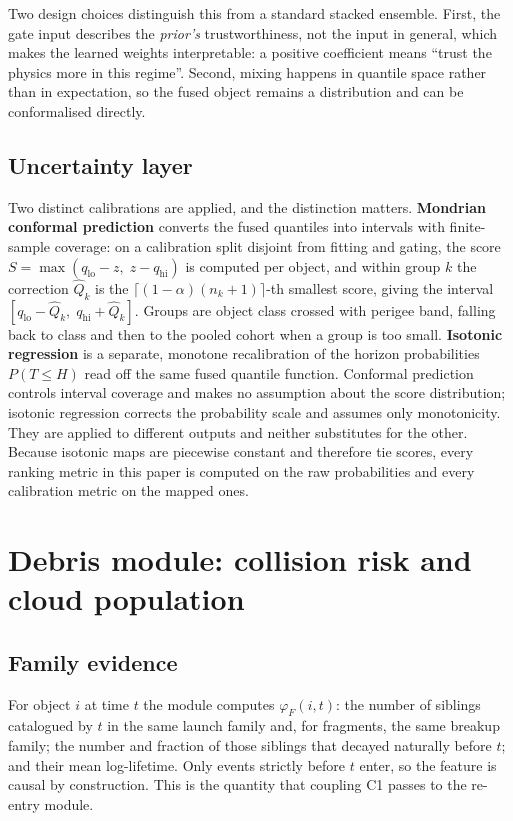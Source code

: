 \documentclass[3p,times]{elsarticle}
\begin{document}
Two design choices distinguish this from a standard stacked ensemble.
First, the gate input describes the \emph{prior's} trustworthiness, not
the input in general, which makes the learned weights interpretable: a
positive coefficient means ``trust the physics more in this regime''.
Second, mixing happens in quantile space rather than in expectation, so
the fused object remains a distribution and can be conformalised
directly.

\subsection{Uncertainty layer}\label{uncertainty-layer}

Two distinct calibrations are applied, and the distinction matters.
\textbf{Mondrian conformal prediction} converts the fused quantiles into
intervals with finite-sample coverage: on a calibration split disjoint
from fitting and gating, the score
\(S = \max(q_{\text{lo}} - z,\; z - q_{\text{hi}})\) is computed per
object, and within group \(k\) the correction \(\hat{Q}_k\) is the
\(\lceil (1-\alpha)(n_k+1) \rceil\)-th smallest score, giving the
interval \([q_{\text{lo}} - \hat{Q}_k,\; q_{\text{hi}} + \hat{Q}_k]\).
Groups are object class crossed with perigee band, falling back to class
and then to the pooled cohort when a group is too small.
\textbf{Isotonic regression} is a separate, monotone recalibration of
the horizon probabilities \(P(T \leq H)\) read off the same fused
quantile function. Conformal prediction controls interval coverage and
makes no assumption about the score distribution; isotonic regression
corrects the probability scale and assumes only monotonicity. They are
applied to different outputs and neither substitutes for the other.
Because isotonic maps are piecewise constant and therefore tie scores,
every ranking metric in this paper is computed on the raw probabilities
and every calibration metric on the mapped ones.

\section{Debris module: collision risk and cloud
population}\label{sec:debris}

\subsection{Family evidence}\label{family-evidence}

For object \(i\) at time \(t\) the module computes \(\varphi_F(i,t)\):
the number of siblings catalogued by \(t\) in the same launch family
and, for fragments, the same breakup family; the number and fraction of
those siblings that decayed naturally before \(t\); and their mean
log-lifetime. Only events strictly before \(t\) enter, so the feature is
causal by construction. This is the quantity that coupling C1 passes to
the re-entry module.
\end{document}
